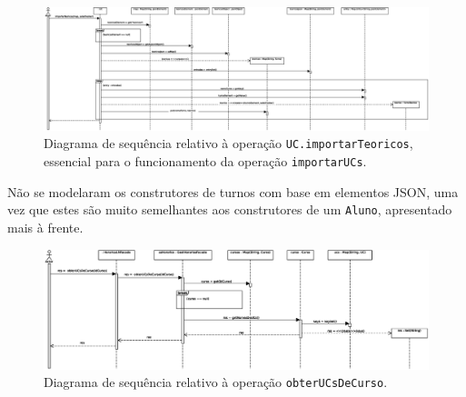 \documentclass[12pt, a4paper]{article}
\begin{document}
\begin{landscape}
        \begin{figure}[H]
            \centering
            \includegraphics[scale=0.50]{Imagens/Modelos/importarUCsConstrutorUCimportarTeoricos.svg.eps}
            \caption{
                Diagrama de sequência relativo à operação \texttt{UC.importarTeoricos}, essencial para o
                funcionamento da operação \texttt{importarUCs}.
            }
        \end{figure}

        Não se modelaram os construtores de turnos com base em elementos JSON, uma vez que estes são
        muito semelhantes aos construtores de um \texttt{Aluno}, apresentado mais à frente.

        \vspace*{\fill}
        \pagebreak
        \vspace*{\fill}

        \begin{figure}[H]
            \centering
            \includegraphics[scale=0.70]{Imagens/Modelos/obterUCsDeCurso.svg.eps}
            \caption{
                Diagrama de sequência relativo à operação \texttt{obterUCsDeCurso}.
            }
        \end{figure}

        \vspace*{\fill}
        \pagebreak
        \vspace*{\fill}


\end{landscape}
\end{document}
